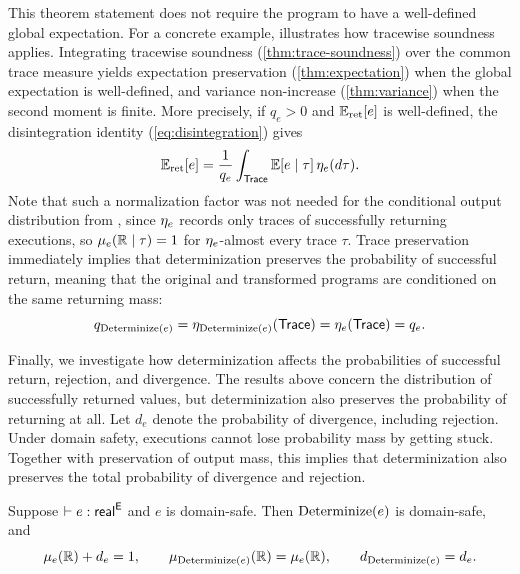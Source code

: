 This theorem statement does
not require the program to have a well-defined global expectation. For a concrete example,  illustrates how
tracewise soundness applies.
%
%
%
Integrating tracewise soundness (\cref{thm:trace-soundness}) over the common
trace measure yields expectation preservation (\cref{thm:expectation}) when
the global expectation is well-defined, and variance non-increase
(\cref{thm:variance}) when the second moment is finite. More precisely, if
$q_e>0$ and $\Expect_{\mathrm{ret}}[e]$ is well-defined, the disintegration
identity (\cref{eq:disintegration}) gives
\[
  \Expect_{\mathrm{ret}}[e]
  =\frac{1}{q_e}
  \int_{\Trace}\Expect[e\mid\tau] \,\trlaw e(d\tau).\leanref{returned-expectation-along-traces}
\]
Note that such a normalization factor was not needed for the
conditional output distribution from , since $\trlaw e$ records only traces
of successfully returning executions, so
$\law e(\Real\mid\tau)=1$ for $\trlaw e$-almost every trace $\tau$.
Trace preservation immediately implies that determinization preserves
the probability of successful return, meaning that the original and
transformed programs are conditioned on the same returning mass:
\[
  q_{\trans e}
  =\trlaw{\trans e}(\Trace)
  =\trlaw e(\Trace)
  =q_e.\leanref{output-mass}
\]


Finally, we investigate how determinization
affects the probabilities of successful return, rejection, and
divergence. The results above concern the distribution of successfully
returned values, but determinization also preserves the probability of
returning at all. Let $d_e$ denote the probability of
divergence, including rejection. Under domain safety,
executions cannot lose probability mass by getting stuck. Together
with preservation of output mass, this implies that determinization
also preserves the total probability of divergence and rejection.

\begin{proposition}
\label{prop:probability}
Suppose $\vdash e:\tyR\E$ and $e$ is domain-safe. Then $\trans e$
is domain-safe, and
\[
  \law e(\Real)+d_e=1\leanref{return-or-diverge},
  \qquad
  \law{\trans e}(\Real)=\law e(\Real)\leanref{output-mass},
  \qquad
  d_{\trans e}=d_e.
\]
\end{proposition}

